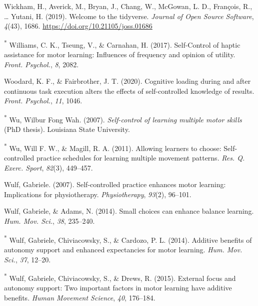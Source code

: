 \documentclass[
  english,
  man,floatsintext]{apa7}
\newlength{\cslhangindent}
\newlength{\cslentryspacingunit} %
\newenvironment{CSLReferences}[2] %
 {%
  \setlength{\parindent}{0pt}
  \ifodd #1
  \let\oldpar\par
  \def\par{\hangindent=\cslhangindent\oldpar}
  \fi
  \setlength{\parskip}{#2\cslentryspacingunit}
 }%
 {}
\begin{document}
\begin{CSLReferences}{1}{0}
\leavevmode{}%
Wickham, H., Averick, M., Bryan, J., Chang, W., McGowan, L. D., François, R., \ldots{} Yutani, H. (2019). Welcome to the {tidyverse}. \emph{Journal of Open Source Software}, \emph{4}(43), 1686. \url{https://doi.org/10.21105/joss.01686}

\leavevmode{}%
\textsuperscript{*} Williams, C. K., Tseung, V., \& Carnahan, H. (2017). {Self-Control} of haptic assistance for motor learning: Influences of frequency and opinion of utility. \emph{Front. Psychol.}, \emph{8}, 2082.

\leavevmode{}%
Woodard, K. F., \& Fairbrother, J. T. (2020). Cognitive loading during and after continuous task execution alters the effects of self-controlled knowledge of results. \emph{Front. Psychol.}, \emph{11}, 1046.

\leavevmode{}%
\textsuperscript{*} Wu, Wilbur Fong Wah. (2007). \emph{Self-control of learning multiple motor skills} (PhD thesis). Louisiana State University.

\leavevmode{}%
\textsuperscript{*} Wu, Will F. W., \& Magill, R. A. (2011). Allowing learners to choose: Self-controlled practice schedules for learning multiple movement patterns. \emph{Res. Q. Exerc. Sport}, \emph{82}(3), 449--457.

\leavevmode{}%
Wulf, Gabriele. (2007). Self-controlled practice enhances motor learning: Implications for physiotherapy. \emph{Physiotherapy}, \emph{93}(2), 96--101.

\leavevmode{}%
Wulf, Gabriele, \& Adams, N. (2014). Small choices can enhance balance learning. \emph{Hum. Mov. Sci.}, \emph{38}, 235--240.

\leavevmode{}%
\textsuperscript{*} Wulf, Gabriele, Chiviacowsky, S., \& Cardozo, P. L. (2014). Additive benefits of autonomy support and enhanced expectancies for motor learning. \emph{Hum. Mov. Sci.}, \emph{37}, 12--20.

\leavevmode{}%
\textsuperscript{*} Wulf, Gabriele, Chiviacowsky, S., \& Drews, R. (2015). External focus and autonomy support: Two important factors in motor learning have additive benefits. \emph{Human Movement Science}, \emph{40}, 176--184.


\end{CSLReferences}
\end{document}
